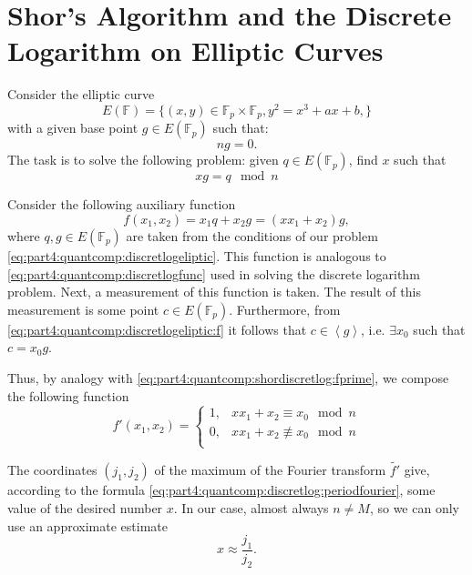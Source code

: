\section{Shor's Algorithm and the Discrete Logarithm on Elliptic Curves} 
Consider the elliptic curve 
\[
E\left(\mathbb{F}\right) = \{
(x,y) \in \mathbb{F}_p \times \mathbb{F}_p, y^2 = x^3 +a x + b,
\}
\]
with a given base point $g \in E\left(\mathbb{F}_p\right)$ such that: 
\[
n g = 0.
\]
The task is to solve the following problem: given $q
\in E\left(\mathbb{F}_p\right)$, find $x$ such that
\begin{equation}
x g = q \mod n
\label{eq:part4:quantcomp:discretlogeliptic}
\end{equation}

Consider the following auxiliary function
\begin{equation}
f(x_1, x_2) = x_1 q + x_2 g = \left(x x_1 + x_2\right) g,
\label{eq:part4:quantcomp:discretlogeliptic:f}
\end{equation}
where $q,g \in E\left(\mathbb{F}_p\right)$ are taken from the conditions of our
problem \eqref{eq:part4:quantcomp:discretlogeliptic}. This function is
analogous to \eqref{eq:part4:quantcomp:discretlogfunc}
used in solving the discrete logarithm problem. Next,
a measurement of this function is taken. The result of this measurement
is some point $c \in E\left(\mathbb{F}_p\right)$. Furthermore, from
\eqref{eq:part4:quantcomp:discretlogeliptic:f} it follows that 
$c \in \left<g\right>$, i.e. $\exists x_0$ such that $c = x_0 g$. 

Thus, by analogy with \eqref{eq:part4:quantcomp:shordiscretlog:fprime}, we
compose the following function 
\begin{equation}
\label{eq:part4:quantcomp:shorelliptic:fprime}
f'\left(x_1, x_2\right) = 
\begin{cases}
1, & x x_1 + x_2 \equiv x_0 \mod n \\
0, & x x_1 + x_2 \not\equiv x_0 \mod n \\
\end{cases}
\end{equation}

The coordinates $(j_1,j_2)$ of the maximum of the Fourier transform $\tilde{f'}$ give,
according to the formula
\eqref{eq:part4:quantcomp:discretlog:periodfourier}, some value of
the desired number $x$. In our case, almost always $n \ne M$,
so we can only use an approximate estimate
\[
x \approx \frac{j_1}{j_2}.
\]

